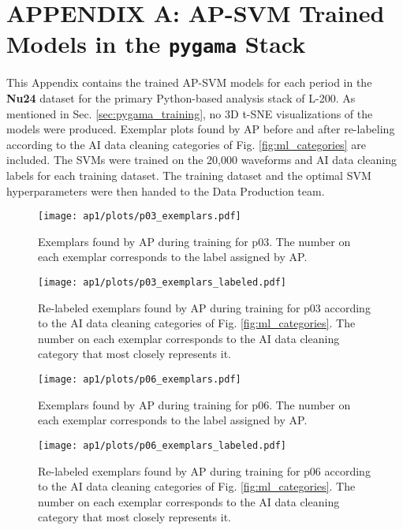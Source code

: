 \chapter*{APPENDIX A: AP-SVM Trained Models in the \texttt{pygama} Stack}
\label{app:pygama_models}

\renewcommand{\thefigure}{A.\arabic{figure}}
\setcounter{figure}{0}

This Appendix contains the trained AP-SVM models for each period in the \textbf{Nu24} dataset for the primary Python-based analysis stack of L-200. As mentioned in Sec. \ref{sec:pygama_training}, no 3D t-SNE visualizations of the models were produced. Exemplar plots found by AP before and after re-labeling according to the AI data cleaning categories of Fig. \ref{fig:ml_categories} are included. The SVMs were trained on the 20,000 waveforms and AI data cleaning labels for each training dataset. The training dataset and the optimal SVM hyperparameters were then handed to the Data Production team.

\begin{figure}[hbtp]
    \centering
    \texttt{[image: ap1/plots/p03\_exemplars.pdf]}
    \caption{Exemplars found by AP during training for p03. The number on each exemplar corresponds to the label assigned by AP.}
    \label{fig:exemplars_p03_pygama}
\end{figure}
\begin{figure}[hbtp]
    \centering
    \texttt{[image: ap1/plots/p03\_exemplars\_labeled.pdf]}
    \caption{Re-labeled exemplars found by AP during training for p03 according to the AI data cleaning categories of Fig. \ref{fig:ml_categories}. The number on each exemplar corresponds to the AI data cleaning category that most closely represents it.}
    \label{fig:exemplars_p03_pygama_labeled}
\end{figure}

\begin{figure}[hbtp]
    \centering
    \texttt{[image: ap1/plots/p06\_exemplars.pdf]}
    \caption{Exemplars found by AP during training for p06. The number on each exemplar corresponds to the label assigned by AP.}
    \label{fig:exemplars_p06_pygama}
\end{figure}
\begin{figure}[hbtp]
    \centering
    \texttt{[image: ap1/plots/p06\_exemplars\_labeled.pdf]}
    \caption{Re-labeled exemplars found by AP during training for p06 according to the AI data cleaning categories of Fig. \ref{fig:ml_categories}. The number on each exemplar corresponds to the AI data cleaning category that most closely represents it.}
    \label{fig:exemplars_p06_pygama_labeled}
\end{figure}

